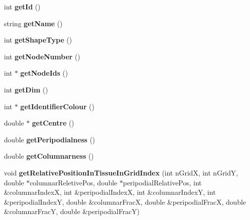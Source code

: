 \begin{DoxyCompactItemize}
\item 
\hypertarget{classShapeBase_ab55ac0089ea8e37649b0d85409c008ac}{}int {\bfseries get\+Id} ()\label{classShapeBase_ab55ac0089ea8e37649b0d85409c008ac}

\item 
\hypertarget{classShapeBase_a49d134532a98fb0cecacec44baf2baf3}{}string {\bfseries get\+Name} ()\label{classShapeBase_a49d134532a98fb0cecacec44baf2baf3}

\item 
\hypertarget{classShapeBase_a7ae6deee4256eb19c6e99b52a40847cb}{}int {\bfseries get\+Shape\+Type} ()\label{classShapeBase_a7ae6deee4256eb19c6e99b52a40847cb}

\item 
\hypertarget{classShapeBase_a46ce732af56537977ce6a34832440309}{}int {\bfseries get\+Node\+Number} ()\label{classShapeBase_a46ce732af56537977ce6a34832440309}

\item 
\hypertarget{classShapeBase_a55c283eaee304f9056089987e9b65012}{}int $\ast$ {\bfseries get\+Node\+Ids} ()\label{classShapeBase_a55c283eaee304f9056089987e9b65012}

\item 
\hypertarget{classShapeBase_ad60d92b34044153a677a8bfc0a31a5df}{}int {\bfseries get\+Dim} ()\label{classShapeBase_ad60d92b34044153a677a8bfc0a31a5df}

\item 
\hypertarget{classShapeBase_af10ec5e87cab16541c892712cf58c54d}{}int $\ast$ {\bfseries get\+Identifier\+Colour} ()\label{classShapeBase_af10ec5e87cab16541c892712cf58c54d}

\item 
\hypertarget{classShapeBase_ab26e6cbde2c8a4f326c32a38de48bcc7}{}double $\ast$ {\bfseries get\+Centre} ()\label{classShapeBase_ab26e6cbde2c8a4f326c32a38de48bcc7}

\item 
\hypertarget{classShapeBase_a90d1eaa5a49262418cee28284da14c16}{}double {\bfseries get\+Peripodialness} ()\label{classShapeBase_a90d1eaa5a49262418cee28284da14c16}

\item 
\hypertarget{classShapeBase_a44c758ac93865a1e51e63212ebfe2787}{}double {\bfseries get\+Columnarness} ()\label{classShapeBase_a44c758ac93865a1e51e63212ebfe2787}

\item 
\hypertarget{classShapeBase_ad88d175251a7604ed47e2b694f111c47}{}void {\bfseries get\+Relative\+Position\+In\+Tissue\+In\+Grid\+Index} (int n\+Grid\+X, int n\+Grid\+Y, double $\ast$columnar\+Reletive\+Pos, double $\ast$peripodial\+Relative\+Pos, int \&columnar\+Index\+X, int \&peripodial\+Index\+X, int \&columnar\+Index\+Y, int \&peripodial\+Index\+Y, double \&columnar\+Frac\+X, double \&peripodial\+Frac\+X, double \&columnar\+Frac\+Y, double \&peripodial\+Frac\+Y)\label{classShapeBase_ad88d175251a7604ed47e2b694f111c47}


\end{DoxyCompactItemize}
